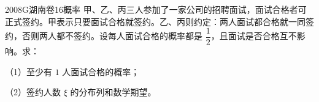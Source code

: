 
\begin{problem}{2008}{G}{湖南卷}{16}{概率}
甲、乙、丙三人参加了一家公司的招聘面试，面试合格者可正式签约。甲表示只要面试合格就签约。乙、丙则约定：两人面试都合格就一同签约，否则两人都不签约。设每人面试合格的概率都是 $\dfrac{1}{2}$，且面试是否合格互不影响。求：

（1）至少有 $1$ 人面试合格的概率；

（2）签约人数 $\xi$ 的分布列和数学期望。
\end{problem}

\begin{answer}

\end{answer}

\begin{solutions}

\end{solutions}